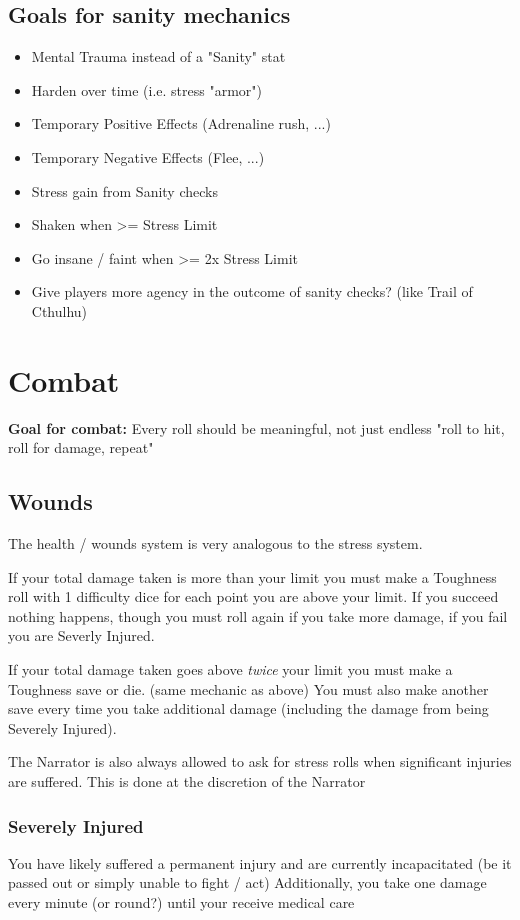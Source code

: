 \section*{Goals for sanity mechanics}
\begin{itemize}
    \item Mental Trauma instead of a "Sanity" stat
    \item Harden over time (i.e. stress "armor")
    \item Temporary Positive Effects (Adrenaline rush, ...)
    \item Temporary Negative Effects (Flee, ...)
    \item Stress gain from Sanity checks
    \item Shaken when >= Stress Limit
    \item Go insane / faint when >= 2x Stress Limit
    \item Give players more agency in the outcome of sanity checks? (like Trail of Cthulhu)
\end{itemize}


\chapter{Combat}

\textbf{Goal for combat:} Every roll should be meaningful, not just endless "roll to hit, roll for damage, repeat" 

\section{Wounds}
The health / wounds system is very analogous to the stress system.

If your total damage taken is more than your limit you must make a Toughness roll with 1 difficulty dice for each point you are above your limit.  
If you succeed nothing happens, though you must roll again if you take more damage, if you fail you are Severly Injured.

If your total damage taken goes above \textit{twice} your limit you must make a Toughness save or die. (same mechanic as above)  
You must also make another save every time you take additional damage (including the damage from being Severely Injured).

The Narrator is also always allowed to ask for stress rolls when significant injuries are suffered. This is done at the discretion of the Narrator


\subsection{Severely Injured}
You have likely suffered a permanent injury and are currently incapacitated (be it passed out or simply unable to fight / act)
Additionally, you take one damage every minute (or round?) until your receive medical care


